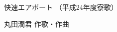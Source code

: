 \documentclass[10pt,b5j]{tarticle} %
\begin{document}
\begin{minipage}[c]{0.7\hsize} %
    \begin{center}
        {\LARGE
            快速エアポート %
        }
        {\small 
            （平成24年度寮歌） %
        }
    \end{center}
\end{minipage}
\begin{minipage}[c]{0.3\hsize} %
    \begin{flushright} %
        丸田潤君 作歌・作曲 %
    \end{flushright}
\end{minipage}
\end{document}
